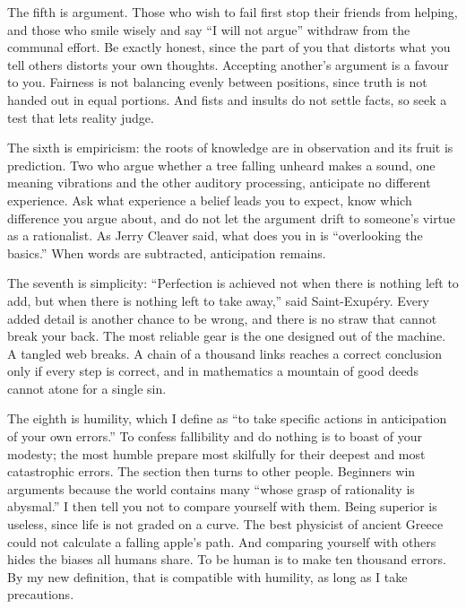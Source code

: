 The fifth is argument. Those who wish to fail first stop their friends from helping, and those who smile wisely and say ``I will not argue'' withdraw from the communal effort. Be exactly honest, since the part of you that distorts what you tell others distorts your own thoughts. Accepting another's argument is a favour to you. Fairness is not balancing evenly between positions, since truth is not handed out in equal portions. And fists and insults do not settle facts, so seek a test that lets reality judge.

The sixth is empiricism: the roots of knowledge are in observation and its fruit is prediction. Two who argue whether a tree falling unheard makes a sound, one meaning vibrations and the other auditory processing, anticipate no different experience. Ask what experience a belief leads you to expect, know which difference you argue about, and do not let the argument drift to someone's virtue as a rationalist. As Jerry Cleaver said, what does you in is ``overlooking the basics.'' When words are subtracted, anticipation remains.

The seventh is simplicity: ``Perfection is achieved not when there is nothing left to add, but when there is nothing left to take away,'' said Saint-Exupéry. Every added detail is another chance to be wrong, and there is no straw that cannot break your back. The most reliable gear is the one designed out of the machine. A tangled web breaks. A chain of a thousand links reaches a correct conclusion only if every step is correct, and in mathematics a mountain of good deeds cannot atone for a single sin.

The eighth is humility, which I define as ``to take specific actions in anticipation of your own errors.'' To confess fallibility and do nothing is to boast of your modesty; the most humble prepare most skilfully for their deepest and most catastrophic errors. The section then turns to other people. Beginners win arguments because the world contains many ``whose grasp of rationality is abysmal.'' I then tell you not to compare yourself with them. Being superior is useless, since life is not graded on a curve. The best physicist of ancient Greece could not calculate a falling apple's path. And comparing yourself with others hides the biases all humans share. To be human is to make ten thousand errors.  By my new definition, that is compatible with humility, as long as I take precautions.

